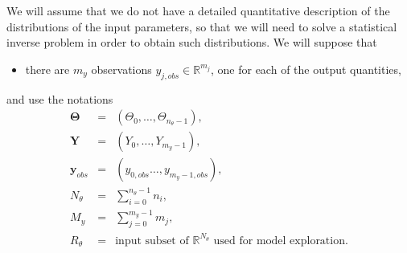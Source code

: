 We will assume that we do not have a detailed quantitative description of the distributions of the input parameters, so that we will need to solve a statistical inverse problem
in order to obtain such distributions. 
We will suppose that
\begin{itemize}
\item there are $m_{y}$ observations $y_{j,obs}\in\mathbb{R}^{m_j}$, one for each of the output quantities,
\end{itemize}
and use the notations
\begin{eqnarray*}
\boldsymbol{\Theta} & =      & (\Theta_0,\ldots,\Theta_{n_\theta-1}), \\
\mathbf{Y}          & =      & (Y_0,     \ldots,Y_{m_y-1}          ), \\
\mathbf{y}_{obs}    & =      & (y_{0,obs}\ldots,y_{m_y-1,obs}      ), \\
N_{\theta}          & =      & \sum_{i=0}^{n_{\theta}-1}n_i,          \\
M_y                 & =      & \sum_{j=0}^{m_y       -1}m_j,          \\
R_{\theta}          & =      & \mbox{input subset of }\mathbb{R}^{N_{\theta}}\mbox{ used for model exploration}.
\end{eqnarray*}

